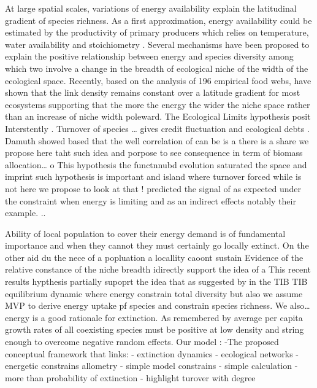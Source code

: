 At large spatial scales, variations of energy availability explain the
latitudinal gradient of species richness. As a first approximation,
energy availability could be estimated by the productivity of primary
producers which relies on temperature, water availability and
stoichiometry \citep{Ott2014}. Several mechanisms have been proposed to
explain the positive relationship between energy and species diversity
\citep[see][ for a review]{Evans2005} among which two involve a change
in the breadth of ecological niche of the width of the ecological space.
Recently, based on the analysis of 196 empirical food webs,
\citet{Cirtwill2015a} have shown that the link density remains constant
over a latitude gradient for most ecosystems supporting that the more
the energy the wider the niche space rather than an increase of niche
width poleward. The Ecological Limits hypothesis posit Interstently
\citet{Rabosky2015}. Turnover of species \ldots{} gives credit
fluctuation and ecological debts . Damuth showed based that the well
correlation of can be is a there is a share we propose here taht such
idea and porpose to see consequence in term of biomass
allocation\ldots{} o This hypothesis the functnnubd evolution saturated
the space and imprint such hypothesis is important and island where
turnover forced while is not here we propose to look at that !
\citet{Hurlbert2014} predicted the signal of as expected under the
constraint when energy is limiting and as an indirect effects notably
their example. ..

Ability of local population to cover their energy demand is of
fundamental importance and when they cannot they must certainly go
locally extinct. On the other aid du the nece of a popluation a
locallity caoont sustain Evidence of the relative constance of the niche
breadth idirectly support the idea of a This recent results hypthesis
partially supoprt the idea that as suggested by in the TIB TIB
equilibrium dynamic where energy constrain total diversity but also we
assume MVP to derive energy uptake pf species and constrain species
richness. We also\ldots{} energy is a good rationale for extinction. As
remembered by \citet{Gravel2011a} average per capita growth rates of all
coexisting species must be positive at low density and string enough to
overcome negative random effects. Our model : -The proposed conceptual
framework that links: - extinction dynamics - ecological networks -
energetic constrains allometry - simple model constrains - simple
calculation - more than probability of extinction - highlight turover
with degree

